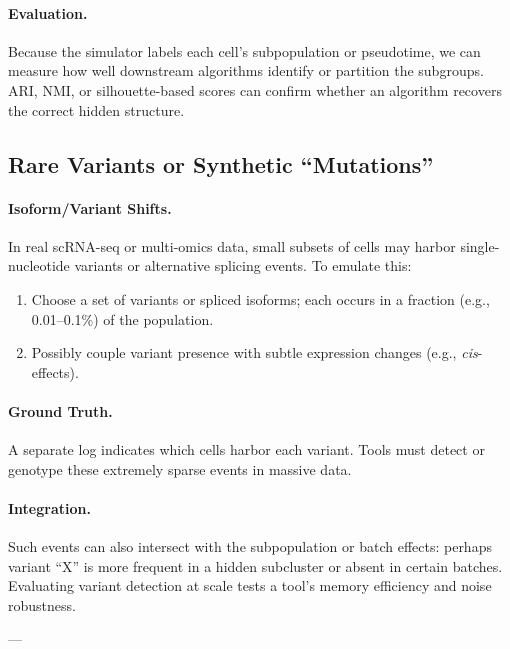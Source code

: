 \documentclass{article}
\begin{document}
\paragraph{Evaluation.}
Because the simulator labels each cell’s subpopulation or pseudotime, we can measure how well downstream algorithms identify or partition the subgroups. ARI, NMI, or silhouette-based scores can confirm whether an algorithm recovers the correct hidden structure.

\subsection{Rare Variants or Synthetic “Mutations”}
\label{sec:1B_variants}

\paragraph{Isoform/Variant Shifts.}
In real scRNA-seq or multi-omics data, small subsets of cells may harbor single-nucleotide variants or alternative splicing events. To emulate this:
\begin{enumerate}
	\item Choose a set of variants or spliced isoforms; each occurs in a fraction (e.g., 0.01--0.1\%) of the population. 
	\item Possibly couple variant presence with subtle expression changes (e.g., \emph{cis}-effects).
\end{enumerate}

\paragraph{Ground Truth.}
A separate log indicates which cells harbor each variant. Tools must detect or genotype these extremely sparse events in massive data.

\paragraph{Integration.}
Such events can also intersect with the subpopulation or batch effects: perhaps variant “X” is more frequent in a hidden subcluster or absent in certain batches. Evaluating variant detection at scale tests a tool’s memory efficiency and noise robustness.

---
\end{document}
